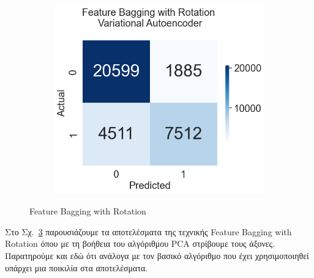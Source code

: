 \documentclass[a4paper,12pt]{report}
\theoremstyle{definitionNODot}
\begin{document}
\begin{figure}[H]
\begin{subfigure}[b]{0.35\textwidth}
			\label{fig:anomaly_by_ensemble_ensemble_rotation_lstm_ae}
		\end{subfigure}
		\medskip
		\begin{subfigure}[b]{0.35\textwidth}
			\centering
			\includegraphics[width=\textwidth]{anomaly_by_ensemble_ensemble_rotation_lstm_vae.png}
			
			\label{fig:anomaly_by_ensemble_ensemble_rotation_lstm_vae}
		\end{subfigure}
		\caption{Feature Bagging with Rotation}
		\label{fig:featurebaggingwithrotationmodelsconfusion}
	\end{figure}
	
	Στο Σχ.~\ref{fig:featurebaggingwithrotationmodelsconfusion} παρουσιάζουμε τα αποτελέσματα της τεχνικής Feature Bagging with Rotation όπου με τη βοήθεια του αλγόριθμου PCA στρίβουμε τους άξονες. Παρατηρούμε και εδώ ότι ανάλογα με τον βασικό αλγόριθμο που έχει χρησιμοποιηθεί υπάρχει μια ποικιλία στα αποτελέσματα.
	
\end{document}
